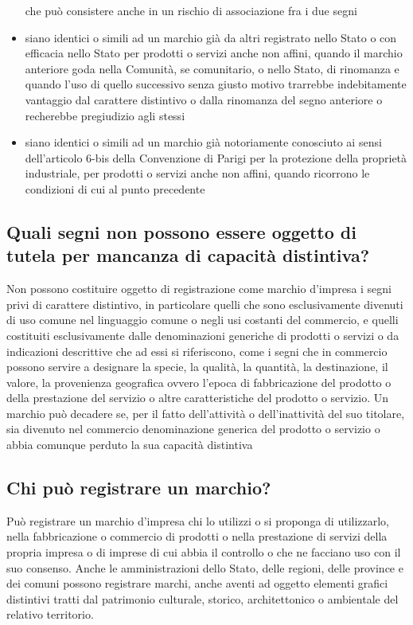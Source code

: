 \begin{itemize}
    che può consistere anche in un rischio di associazione fra i due segni
    \item siano identici o simili ad un marchio già da altri registrato nello Stato o con efficacia nello Stato per prodotti o servizi anche non affini,
    quando il marchio anteriore goda nella Comunità, se comunitario, o nello Stato, di rinomanza e quando l'uso di quello successivo senza giusto motivo trarrebbe indebitamente vantaggio
    dal carattere distintivo o dalla rinomanza del segno anteriore o recherebbe pregiudizio agli stessi
    \item siano identici o simili ad un marchio già notoriamente conosciuto ai sensi dell'articolo 6-bis della Convenzione di Parigi per la protezione della proprietà industriale, per prodotti
    o servizi anche non affini, quando ricorrono le condizioni di cui al punto precedente

\end{itemize}

\subsection{Quali segni non possono essere oggetto di tutela per mancanza di capacità distintiva?}
Non possono costituire oggetto di registrazione come marchio d'impresa i segni privi di carattere distintivo, in particolare
quelli che sono esclusivamente divenuti di uso comune nel linguaggio comune o negli usi costanti del commercio, e quelli
costituiti esclusivamente dalle denominazioni generiche di prodotti o servizi o da indicazioni descrittive che ad essi si
riferiscono, come i segni che in commercio possono servire a designare la specie, la qualità, la quantità, la destinazione,
il valore, la provenienza geografica ovvero l'epoca di fabbricazione del prodotto o della prestazione del servizio o altre caratteristiche
del prodotto o servizio.\newline
Un marchio può decadere se, per il fatto dell'attività o dell'inattività del suo titolare, sia divenuto nel commercio denominazione
generica del prodotto o servizio o abbia comunque perduto la sua capacità distintiva

\subsection{Chi può registrare un marchio?}
Può registrare un marchio d'impresa chi lo utilizzi o si proponga di utilizzarlo, nella fabbricazione o commercio di prodotti
o nella prestazione di servizi della propria impresa o di imprese di cui abbia il controllo o che ne facciano uso con il suo consenso.\newline
Anche le amministrazioni dello Stato, delle regioni, delle province e dei comuni possono registrare marchi, anche aventi ad oggetto elementi grafici distintivi
tratti dal patrimonio culturale, storico, architettonico o ambientale del relativo territorio. \newline

